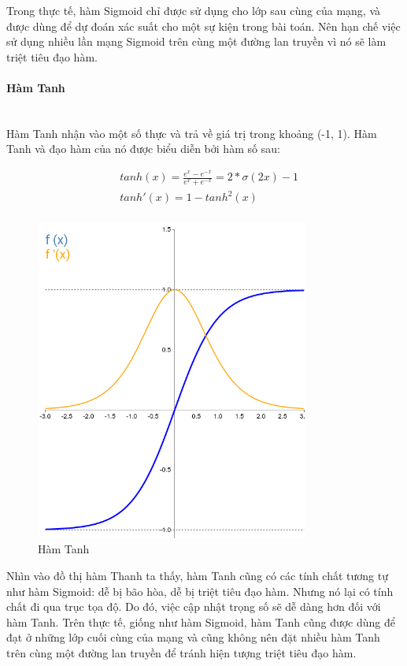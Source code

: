 Trong thực tế, hàm Sigmoid chỉ được sử dụng cho lớp sau cùng của mạng, và được dùng để dự đoán xác suất cho một sự kiện trong bài toán. Nên hạn chế việc sử dụng nhiều lần mạng Sigmoid trên cùng một đường lan truyền vì nó sẽ làm triệt tiêu đạo hàm.

\paragraph{Hàm Tanh}\mbox{}\\

Hàm Tanh nhận vào một số thực và trả về giá trị trong khoảng (-1, 1). Hàm Tanh và đạo hàm của nó được biểu diễn bởi hàm số sau:

\begin{equation}
\begin{split}
    & tanh(x)=\frac{e^x-e^{-x}}{e^x+e^{-x}}=2*\sigma(2x)-1\\
    & tanh'(x)=1-tanh^2(x)\\
\end{split}
\end{equation}

\begin{figure}[H]
    \centering
    \includegraphics[width=9cm]{./content/materials/tanh.png}
    \caption{Hàm Tanh}
\end{figure}

Nhìn vào đồ thị hàm Thanh ta thấy, hàm Tanh cũng có các tính chất tương tự như hàm Sigmoid: dễ bị bão hòa, dễ bị triệt tiêu đạo hàm. Nhưng nó lại có tính chất đi qua trục tọa độ. Do đó, việc cập nhật trọng số sẽ dễ dàng hơn đối với hàm Tanh. Trên thực tế, giống như hàm Sigmoid, hàm Tanh cũng được dùng để đạt ở những lớp cuối cùng của mạng và cũng không nên đặt nhiều hàm Tanh trên cùng một đường lan truyền để tránh hiện tượng triệt tiêu đạo hàm.

